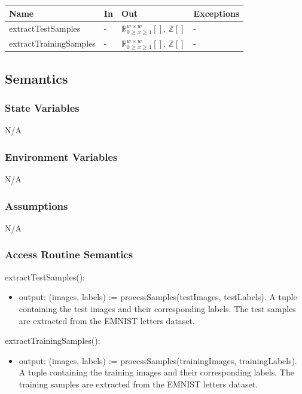 \documentclass[12pt, titlepage]{article}
\begin{document}
\begin{center}
\begin{tabular}{p{5cm} p{2cm} p{4cm} p{2cm}}
\hline
\textbf{Name} & \textbf{In} & \textbf{Out} & \textbf{Exceptions} \\
\hline
extractTestSamples & - & ${\mathbb{R}^{w \times w}_{0 \ge x \ge 1}[]}$, ${\mathbb{Z}[]}$ & - \\
extractTrainingSamples & - & ${\mathbb{R}^{w \times w}_{0 \ge x \ge 1}[]}$, ${\mathbb{Z}[]}$ & - \\
\hline
\end{tabular}
\end{center}

\subsection{Semantics}

\subsubsection{State Variables}

N/A

\subsubsection{Environment Variables}

N/A

\subsubsection{Assumptions}

N/A

\subsubsection{Access Routine Semantics}

\noindent extractTestSamples():
\begin{itemize}
\item output: (images, labels) := processSamples(testImages, testLabels). A
tuple containing the test images and their corresponding labels. The test
samples are extracted from the EMNIST letters dataset.
\end{itemize}

\noindent extractTrainingSamples():
\begin{itemize}
\item output: (images, labels) := processSamples(trainingImages, trainingLabels).
A tuple containing the training images and their corresponding labels. The
training samples are extracted from the EMNIST letters dataset.
\end{itemize}
\end{document}
